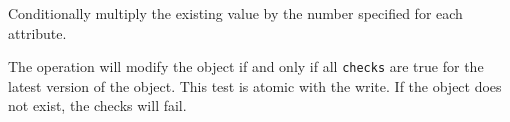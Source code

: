 Conditionally multiply the existing value by the number specified for each attribute.

The operation will modify the object if and only if all \texttt{checks} are true
for the latest version of the object.  This test is atomic with the write.  If
the object does not exist, the checks will fail.




